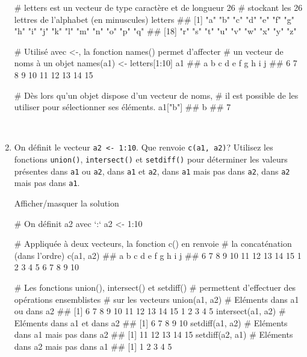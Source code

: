 \documentclass[12pt,]{article}
\newenvironment{Shaded}{}{}
\newcommand{\KeywordTok}[1]{\textcolor[rgb]{0.00,0.00,1.00}{{#1}}}
\newcommand{\DecValTok}[1]{{#1}}
\newcommand{\StringTok}[1]{\textcolor[rgb]{0.00,0.50,0.50}{{#1}}}
\newcommand{\CommentTok}[1]{\textcolor[rgb]{0.00,0.50,0.00}{{#1}}}
\newcommand{\NormalTok}[1]{{#1}}
\begin{document}
\begin{enumerate}
\begin{Shaded}
\begin{Highlighting}[]
\CommentTok{# letters est un vecteur de type caractère et de longueur 26}
\CommentTok{# stockant les 26 lettres de l'alphabet (en minuscules)}
\NormalTok{letters}
\NormalTok{##  [1] "a" "b" "c" "d" "e" "f" "g" "h" "i" "j" "k" "l" "m" "n" "o" "p" "q"}
\NormalTok{## [18] "r" "s" "t" "u" "v" "w" "x" "y" "z"}

\CommentTok{# Utilisé avec <-, la fonction names() permet d'affecter }
\CommentTok{# un vecteur de noms à un objet}
\KeywordTok{names}\NormalTok{(a1) <-}\StringTok{ }\NormalTok{letters[}\DecValTok{1}\NormalTok{:}\DecValTok{10}\NormalTok{]}
\NormalTok{a1}
\NormalTok{##  a  b  c  d  e  f  g  h  i  j }
\NormalTok{##  6  7  8  9 10 11 12 13 14 15}

\CommentTok{# Dès lors qu'un objet dispose d'un vecteur de noms, }
\CommentTok{# il est possible de les utiliser pour sélectionner ses éléments.}
\NormalTok{a1[}\StringTok{"b"}\NormalTok{]}
\NormalTok{## b }
\NormalTok{## 7}
\end{Highlighting}
\end{Shaded}

  ~
\item
  On définit le vecteur \texttt{a2\ \textless{}-\ 1:10}. Que renvoie
  \texttt{c(a1,\ a2)}? Utilisez les fonctions \texttt{union()},
  \texttt{intersect()} et \texttt{setdiff()} pour déterminer les valeurs
  présentes dans \texttt{a1} ou \texttt{a2}, dans \texttt{a1} et
  \texttt{a2}, dans \texttt{a1} mais pas dans \texttt{a2}, dans
  \texttt{a2} mais pas dans \texttt{a1}.

  Afficher/masquer la solution

  \hypertarget{sol4}{}
\begin{Shaded}
\begin{Highlighting}[]
\CommentTok{# On définit a2 avec `:`}
\NormalTok{a2 <-}\StringTok{ }\DecValTok{1}\NormalTok{:}\DecValTok{10}

\CommentTok{# Appliquée à deux vecteurs, la fonction c() en renvoie}
\CommentTok{# la concaténation (dans l'ordre)}
\KeywordTok{c}\NormalTok{(a1, a2)}
\NormalTok{##  a  b  c  d  e  f  g  h  i  j                               }
\NormalTok{##  6  7  8  9 10 11 12 13 14 15  1  2  3  4  5  6  7  8  9 10}

\CommentTok{# Les fonctions union(), intersect() et setdiff()}
\CommentTok{# permettent d'effectuer des opérations ensemblistes}
\CommentTok{# sur les vecteurs }
\KeywordTok{union}\NormalTok{(a1, a2) }\CommentTok{# Eléments dans a1 ou dans a2 }
\NormalTok{##  [1]  6  7  8  9 10 11 12 13 14 15  1  2  3  4  5}
\KeywordTok{intersect}\NormalTok{(a1, a2) }\CommentTok{# Eléments dans a1 et dans a2}
\NormalTok{## [1]  6  7  8  9 10}
\KeywordTok{setdiff}\NormalTok{(a1, a2) }\CommentTok{# Eléments dans a1 mais pas dans a2}
\NormalTok{## [1] 11 12 13 14 15}
\KeywordTok{setdiff}\NormalTok{(a2, a1) }\CommentTok{# Eléments dans a2 mais pas dans a1}
\NormalTok{## [1] 1 2 3 4 5}


\end{Highlighting}
\end{Shaded}
\end{enumerate}
\end{document}
